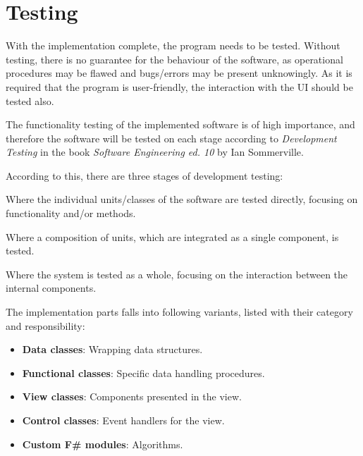 \chapter{Testing}\label{ch:Testing}


With the implementation complete, the program needs to be tested. Without testing, there is no guarantee for the behaviour of the software, as operational procedures may be flawed and bugs/errors may be present unknowingly. As it is required that the program is user-friendly, the interaction with the UI should be tested also.

\vspace{5mm}
The functionality testing of the implemented software is of high importance, and therefore the software will be tested on each stage according to \textit{Development Testing} in the book \textit{Software Engineering ed. 10} by Ian Sommerville\cite{SoftwareEngineering}.

\vspace{5mm}
According to this, there are three stages of development testing:

Where the individual units/classes of the software are tested directly, focusing on functionality and/or methods.

Where a composition of units, which are integrated as a single component, is tested.

Where the system is tested as a whole, focusing on the interaction between the internal components.

\vspace{1cm}
The implementation parts falls into following variants, listed with their category and responsibility:
\begin{itemize}
    \item \textbf{Data classes}: Wrapping data structures.
    \item \textbf{Functional classes}: Specific data handling procedures.
    \item \textbf{View classes}: Components presented in the view.
    \item \textbf{Control classes}: Event handlers for the view.
    \item \textbf{Custom F\# modules}: Algorithms.
\end{itemize}


